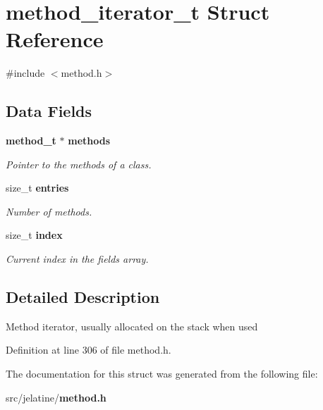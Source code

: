 \section{method\_\-iterator\_\-t Struct Reference}
\label{structmethod__iterator__t}


{\ttfamily \#include $<$method.h$>$}

\subsection*{Data Fields}
\begin{DoxyCompactItemize}
\item 
{\bf method\_\-t} $\ast$ {\bf methods}\label{structmethod__iterator__t_a876eccfde37cd2a9a32e8bb81fa974eb}

\begin{DoxyCompactList}\small\item\em Pointer to the methods of a class. \item\end{DoxyCompactList}\item 
size\_\-t {\bf entries}\label{structmethod__iterator__t_aa811df1a0b12333d92c5a7fa52689f79}

\begin{DoxyCompactList}\small\item\em Number of methods. \item\end{DoxyCompactList}\item 
size\_\-t {\bf index}\label{structmethod__iterator__t_aba923715c4632137fccd428798a8d691}

\begin{DoxyCompactList}\small\item\em Current index in the fields array. \item\end{DoxyCompactList}\end{DoxyCompactItemize}


\subsection{Detailed Description}
Method iterator, usually allocated on the stack when used 

Definition at line 306 of file method.h.



The documentation for this struct was generated from the following file:\begin{DoxyCompactItemize}
\item 
src/jelatine/{\bf method.h}\end{DoxyCompactItemize}
